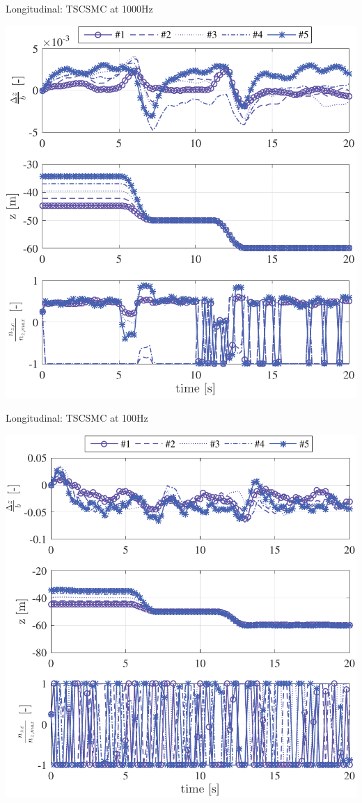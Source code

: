\documentclass[]{beamer}
\begin{document}
\begin{frame}{Longitudinal: TSCSMC \cite{galzi2006uav} at 1000Hz}
\begin{center}
\includegraphics[height=.6\paperwidth]{TSCSMC-1000Hz-TIMESCALESEPARATION-turbulence=1}    
\end{center}%
\end{frame}

\begin{frame}{Longitudinal: TSCSMC at 100Hz}
\begin{center}
\includegraphics[height=.6\paperwidth]{TSCSMC-100Hz-TIMESCALESEPARATION-turbulence=1}    
\end{center}%
\end{frame}
\end{document}
